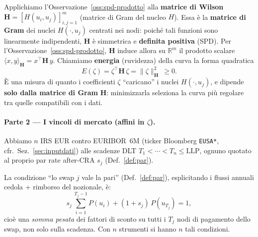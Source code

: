 \documentclass[11pt,a4paper]{article}
\theoremstyle{plain}
\theoremstyle{definition}
\theoremstyle{remark}
\newcommand{\LLP}{\ensuremath{\mathrm{LLP}}}
\newcommand{\Hmat}{\mathbf{H}}
\newcommand{\transp}{^{\!\top}}
\begin{document}
Applichiamo l'Osservazione~\ref{oss:spd-prodotto} alla \textbf{matrice di Wilson}
$\Hmat = [H(u_i,u_j)]_{i,j=1}^{m}$ (matrice di Gram del nucleo $H$). Essa \`e la
\textbf{matrice di Gram} dei nuclei $H(\cdot,u_j)$ centrati nei nodi: poich\'e tali funzioni sono linearmente
indipendenti, $\Hmat$ \`e simmetrica e \textbf{definita positiva} (SPD). Per
l'Osservazione~\ref{oss:spd-prodotto}, $\Hmat$ induce allora su $\mathbb{R}^m$ il prodotto
scalare $\langle x,y\rangle_{\Hmat} = x\transp\Hmat\,y$. Chiamiamo \textbf{energia}
(ruvidezza) della curva la forma quadratica
\[
  E(\zeta) = \zeta\transp \Hmat\, \zeta = \|\zeta\|_{\Hmat}^2 \ \ge 0 .
\]
\`E una misura di quanto i coefficienti $\zeta$ ``caricano'' i nuclei $H(\cdot,u_j)$, e dipende
\textbf{solo dalla matrice di Gram} $\Hmat$: minimizzarla seleziona la curva pi\`u regolare
tra quelle compatibili con i dati.

\paragraph{Parte 2 --- I vincoli di mercato (affini in $\zeta$).}
Abbiamo $n$ IRS EUR contro EURIBOR~6M (ticker Bloomberg \texttt{EUSA*},
cfr.~Sez.~\ref{sec:inputdati}) alle scadenze DLT $T_1<\cdots<T_n\le\LLP$, ognuno quotato al
proprio par rate after-CRA $s_j$ (Def.~\ref{def:par}).

La condizione ``lo swap $j$ vale la pari'' (Def.~\ref{def:par}), esplicitando i flussi
annuali cedola + rimborso del nozionale, \`e:
\[
  s_j\,\sum_{i=1}^{T_j-1} P(u_i) + (1+s_j)\,P(u_{T_j}) = 1,
\]
cio\`e una \emph{somma pesata} dei fattori di sconto su tutti i $T_j$ nodi di pagamento dello
swap, non solo sulla scadenza. Con $n$ strumenti si hanno $n$ tali condizioni.
\end{document}
